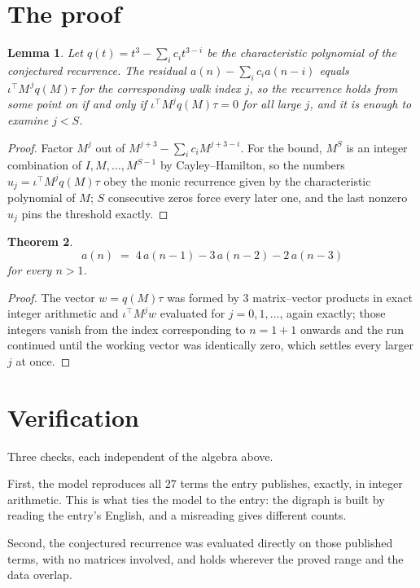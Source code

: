 \documentclass[11pt,a4paper]{article}
\theoremstyle{plain}
\newtheorem{theorem}{Theorem}
\newtheorem{lemma}[theorem]{Lemma}
\theoremstyle{definition}
\begin{document}
\section{The proof}

\begin{lemma}\label{lem:crit}
Let $q(t)=t^{3}-\sum_i c_it^{3-i}$ be the characteristic polynomial of the
conjectured recurrence. The residual $a(n)-\sum_ic_ia(n-i)$ equals
$\iota^{\!\top}M^{\,j}q(M)\tau$ for the corresponding walk index $j$, so the recurrence
holds from some point on if and only if $\iota^{\!\top}M^{j}q(M)\tau=0$ for all large $j$,
and it is enough to examine $j<S$.
\end{lemma}

\begin{proof}
Factor $M^{j}$ out of $M^{j+3}-\sum_ic_iM^{j+3-i}$. For the bound, $M^{S}$
is an integer combination of $I,M,\dots,M^{S-1}$ by Cayley--Hamilton, so the numbers
$u_j=\iota^{\!\top}M^{j}q(M)\tau$ obey the monic recurrence given by the characteristic
polynomial of $M$; $S$ consecutive zeros force every later one, and the last nonzero $u_j$
pins the threshold exactly.
\end{proof}

\begin{theorem}
\[
a(n)\;=\;4\,a(n-1) - 3\,a(n-2) - 2\,a(n-3)
\]
for every $n>1$.
\end{theorem}

\begin{proof}
The vector $w=q(M)\tau$ was formed by $3$ matrix--vector products in exact integer
arithmetic and $\iota^{\!\top}M^{j}w$ evaluated for $j=0,1,\dots$, again exactly; those
integers vanish from the index corresponding to $n=1+1$ onwards and the run continued
until the working vector was identically zero, which settles every larger $j$ at once.
\end{proof}

\section{Verification}

Three checks, each independent of the algebra above.

First, the model reproduces all $27$ terms the entry publishes, exactly, in integer
arithmetic. This is what ties the model to the entry: the digraph is built by reading the
entry's English, and a misreading gives different counts.

Second, the conjectured recurrence was evaluated directly on those published terms, with no
matrices involved, and holds wherever the proved range and the data overlap.
\end{document}
